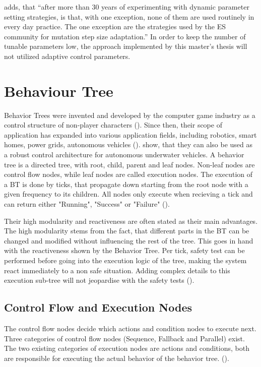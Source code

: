 \cite{kacprzyk_parameter_2007} adds, that \enquote{after more than 30 years of experimenting with dynamic parameter setting strategies, is that, with one exception, none of them are used routinely in every day practice. The one exception are the strategies used by the ES community for mutation step size adaptation.} In order to keep the number of tunable parameters low, the approach implemented by this master's thesis will not utilized adaptive control parameters.

\section{Behaviour Tree}
Behavior Trees were invented and developed by the computer game industry as a control structure of non-player characters (\cite{collendanchise_behavior_2019}). Since then, their scope of application has expanded into various application fields, including robotics, smart homes, power grids, autonomous vehicles (\cite{iovino_survey_2022}). \cite{sprague_improving_2018} show, that they can also be used as a robust control architecture for autonomous underwater vehicles. A behavior tree is a directed tree, with root, child, parent and leaf nodes. Non-leaf nodes are control flow nodes, while leaf nodes are called execution nodes. The execution of a BT is done by ticks, that propagate down starting from the root node with a given frequency to its children. All nodes only execute when recieving a tick and can return either "Running", "Success" or "Failure" (\cite{collendanchise_behavior_2019}).

Their high modularity and reactiveness are often stated as their main advantages. The high modularity stems from the fact, that different parts in the BT can be changed and modified without influencing the rest of the tree. This goes in hand with the reactiveness shown by the Behavior Tree. Per tick, safety test can be performed before going into the execution logic of the tree, making the system react immediately to a non safe situation. Adding complex details to this execution sub-tree will not jeopardise with the safety tests (\cite{sprague_improving_2018}).

\subsection{Control Flow and Execution Nodes}
The control flow nodes decide which actions and condition nodes to execute next. Three categories of control flow nodes (Sequence, Fallback and Parallel) exist. The two existing categories of execution nodes are actions and conditions, both are responsible for executing the actual behavior of the behavior tree. (\cite{collendanchise_behavior_2019}).


